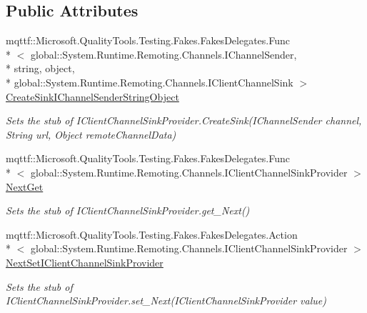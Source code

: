 \subsection*{Public Attributes}
\begin{DoxyCompactItemize}
\item 
mqttf\-::\-Microsoft.\-Quality\-Tools.\-Testing.\-Fakes.\-Fakes\-Delegates.\-Func\\*
$<$ global\-::\-System.\-Runtime.\-Remoting.\-Channels.\-I\-Channel\-Sender, \\*
string, object, \\*
global\-::\-System.\-Runtime.\-Remoting.\-Channels.\-I\-Client\-Channel\-Sink $>$ \hyperlink{class_system_1_1_runtime_1_1_remoting_1_1_channels_1_1_fakes_1_1_stub_i_client_channel_sink_provider_adea896dfe83a6f59b26aea585fcd9f81}{Create\-Sink\-I\-Channel\-Sender\-String\-Object}
\begin{DoxyCompactList}\small\item\em Sets the stub of I\-Client\-Channel\-Sink\-Provider.\-Create\-Sink(\-I\-Channel\-Sender channel, String url, Object remote\-Channel\-Data)\end{DoxyCompactList}\item 
mqttf\-::\-Microsoft.\-Quality\-Tools.\-Testing.\-Fakes.\-Fakes\-Delegates.\-Func\\*
$<$ global\-::\-System.\-Runtime.\-Remoting.\-Channels.\-I\-Client\-Channel\-Sink\-Provider $>$ \hyperlink{class_system_1_1_runtime_1_1_remoting_1_1_channels_1_1_fakes_1_1_stub_i_client_channel_sink_provider_a9bc9620daf22641803379354210fe9d8}{Next\-Get}
\begin{DoxyCompactList}\small\item\em Sets the stub of I\-Client\-Channel\-Sink\-Provider.\-get\-\_\-\-Next()\end{DoxyCompactList}\item 
mqttf\-::\-Microsoft.\-Quality\-Tools.\-Testing.\-Fakes.\-Fakes\-Delegates.\-Action\\*
$<$ global\-::\-System.\-Runtime.\-Remoting.\-Channels.\-I\-Client\-Channel\-Sink\-Provider $>$ \hyperlink{class_system_1_1_runtime_1_1_remoting_1_1_channels_1_1_fakes_1_1_stub_i_client_channel_sink_provider_ae925c3e3c97fc4257628d16d02e49f5d}{Next\-Set\-I\-Client\-Channel\-Sink\-Provider}
\begin{DoxyCompactList}\small\item\em Sets the stub of I\-Client\-Channel\-Sink\-Provider.\-set\-\_\-\-Next(\-I\-Client\-Channel\-Sink\-Provider value)\end{DoxyCompactList}\end{DoxyCompactItemize}


